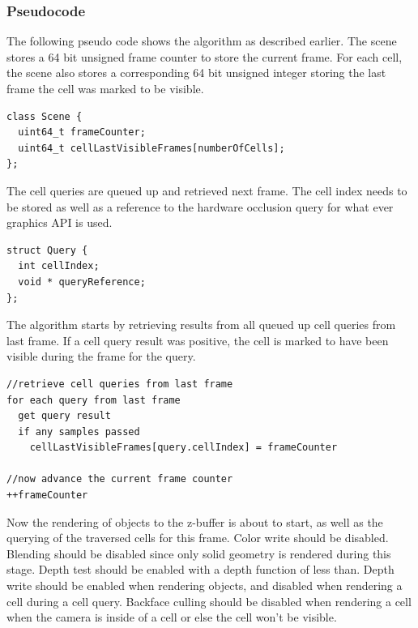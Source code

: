 \documentclass[12pt]{ucthesis}
\begin{document}
\subsubsection{Pseudocode}
\label{pseudo-code-1}

The following pseudo code shows the algorithm as described earlier.
The scene stores a 64 bit unsigned frame counter to store the current frame.
For each cell, the scene also stores a corresponding 64 bit unsigned integer storing the last frame the cell was marked to be visible.

\begin{lstlisting}
class Scene {
  uint64_t frameCounter;
  uint64_t cellLastVisibleFrames[numberOfCells];
};
\end{lstlisting}

The cell queries are queued up and retrieved next frame.
The cell index needs to be stored as well as a reference to the hardware occlusion query for what ever graphics API is used.

\begin{lstlisting}
struct Query {
  int cellIndex;
  void * queryReference;
};
\end{lstlisting}

The algorithm starts by retrieving results from all queued up cell queries from last frame.
If a cell query result was positive, the cell is marked to have been visible during the frame for the query.

\begin{lstlisting}
//retrieve cell queries from last frame
for each query from last frame
  get query result
  if any samples passed
    cellLastVisibleFrames[query.cellIndex] = frameCounter

//now advance the current frame counter
++frameCounter
\end{lstlisting}

Now the rendering of objects to the z-buffer is about to start, as well as the querying of the traversed cells for this frame.
Color write should be disabled.
Blending should be disabled since only solid geometry is rendered during this stage.
Depth test should be enabled with a depth function of less than.
Depth write should be enabled when rendering objects, and disabled when rendering a cell during a cell query.
Backface culling should be disabled when rendering a cell when the camera is inside of a cell or else the cell won't be visible.
\end{document}
